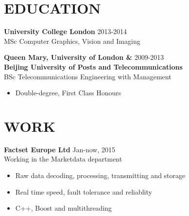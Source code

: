 \documentclass[line,margin]{res}
\begin{document}
\address{}
\address{}

\begin{resume}
\renewcommand{\labelitemi}{-}


\section{EDUCATION} 
{\bf University College London} \hfill{\textcolor[rgb]{0.7,0.7,0.7}{2013-2014}}\\
MSc Computer Graphics, Vision and Imaging


{\bf Queen Mary, University of London \&} \hfill{\textcolor[rgb]{0.7,0.7,0.7}{2009-2013}}\\
{\bf Beijing University of Posts and Telecommunications}\\
BSc Telecommunications Engineering with Management
\begin{itemize}\itemsep -2pt %
    \item Double-degree, First Class Honours
\end{itemize}



\section{WORK}
{\bf Factset Europe Ltd}
\hfill{\textcolor[rgb]{0.7,0.7,0.7}{Jan-now, 2015}}\\
Working in the Marketdata department
\begin{itemize}\itemsep -2pt %
    \item Raw data decoding, processing, transmitting and storage
    \item Real time speed, fault tolerance and reliablity
    \item C++, Boost and multithreading
\end{itemize}





\end{resume}
\end{document}
